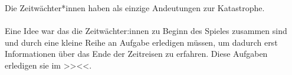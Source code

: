 Die Zeitwächter*innen haben als einzige Andeutungen zur Katastrophe.\\\\
%
Eine Idee war das die Zeitwächter:innen zu Beginn des Spieles 
zusammen sind und durch eine kleine Reihe an Aufgabe erledigen müssen, um
dadurch erst Informationen über das Ende der Zeitreisen zu erfahren. Diese
Aufgaben erledigen sie im >><<.
